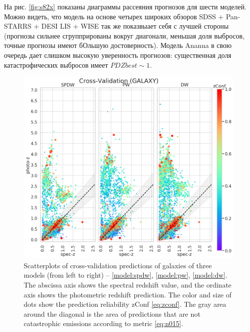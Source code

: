 \documentclass[fleqn,usenatbib]{mnras}
\begin{document}
На рис. \ref{fig:s82x} показаны диаграммы рассеяния прогнозов для шести моделей. Можно видеть, что модель на основе четырех широких обзоров SDSS + Pan-STARRS + DESI LIS + WISE так же показвыает себя с лучшей стороны (прогнозы сильнее сгруппрированы вокруг диагонали, меньшая доля выбросов, точные прогнозы имеют бОльшую достоверность). Модель Ananna в свою очередь дает слишком высокую уверенность прогнозов: существенная доля катастрофических выбросов имеет $PDZbest \sim 1$.

\begin{figure}
    \centering
    \includegraphics[width=0.9\linewidth]{images/scatterplots-cv2-gal.png}
    \caption{Scatterplots of cross-validation predictions of galaxies of three models (from left to right) -- \ref{model:spdw}, \ref{model:pw}, \ref{model:dw}. The abscissa axis shows the spectral redshift value, and the ordinate axis shows the photometric redshift prediction. The color and size of dots show the prediction reliability zConf \eqref{eq:zconf}. The gray area around the diagonal is the area of predictions that are not catastrophic emissions according to metric \eqref{eq:n015}.}
    \label{fig:metrics-cv2-gal}
\end{figure}
\end{document}
